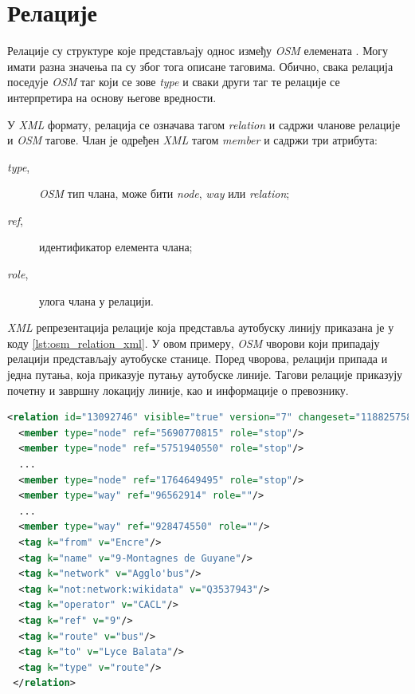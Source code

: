\documentclass[12pt,oneside]{memoir}
\begin{document}
\section{Релације}
\label{sec:osm_relations}

Релације су структуре које представљају однос између \textit{OSM} елемената \cite{osm_wiki}. Могу имати разна значења па су због тога описане таговима. Обично, свака релација поседује \textit{OSM} таг који се зове \textit{type} и сваки други таг те релације се интерпретира на основу његове вредности.

У \textit{XML} формату, релација се означава тагом \textit{relation} и садржи чланове релације и \textit{OSM} тагове. Члан је одређен \textit{XML} тагом \textit{member} и садржи три атрибута:

\begin{description}
	\item[\textit{type},] \textit{OSM} тип члана, може бити \textit{node}, \textit{way} или \textit{relation};
	\item[\textit{ref},] идентификатор елемента члана;
	\item[\textit{role},] улога члана у релацији.
\end{description}

\textit{XML} репрезентација релације која представља аутобуску линију приказана је у коду \ref{lst:osm_relation_xml}. У овом примеру, \textit{OSM} чворови који припадају релацији представљају аутобуске станице. Поред чворова, релацији припада и једна путања, која приказује путању аутобуске линије. Тагови релације приказују почетну и завршну локацију линије, као и информације о превознику.

\begin{lstlisting}[language=XML, caption={\textit{XML} запис \textit{OSM} релације која представља аутобуску линију}, label={lst:osm_relation_xml}]
<relation id="13092746" visible="true" version="7" changeset="118825758" timestamp="2022-03-23T15:05:48Z" user="" uid="">
  <member type="node" ref="5690770815" role="stop"/>
  <member type="node" ref="5751940550" role="stop"/>
  ...
  <member type="node" ref="1764649495" role="stop"/>
  <member type="way" ref="96562914" role=""/>
  ...
  <member type="way" ref="928474550" role=""/>
  <tag k="from" v="Encre"/>
  <tag k="name" v="9-Montagnes de Guyane"/>
  <tag k="network" v="Agglo'bus"/>
  <tag k="not:network:wikidata" v="Q3537943"/>
  <tag k="operator" v="CACL"/>
  <tag k="ref" v="9"/>
  <tag k="route" v="bus"/>
  <tag k="to" v="Lyce Balata"/>
  <tag k="type" v="route"/>
 </relation>
\end{lstlisting}
\end{document}
